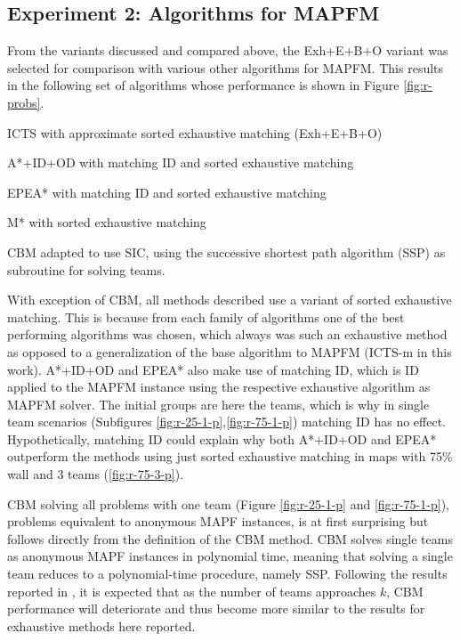 \documentclass[english]{article}
\begin{document}
	\subsection{Experiment 2: Algorithms for MAPFM}
	From the variants discussed and compared above, the Exh+E+B+O variant was selected for comparison with various other algorithms for MAPFM. This results in the following set of algorithms whose performance is shown in Figure \ref{fig:r-probs}.
	\begin{itemize}
		\begin{minipage}{0.45\linewidth}
			\item ICTS with approximate sorted exhaustive matching (Exh+E+B+O)
			\item A*+ID+OD with matching ID and sorted exhaustive matching\cite{bruin2021}
			\item EPEA* with matching ID and sorted exhaustive matching\cite{jong2021}
		\end{minipage}
		\hspace{1cm}
		\begin{minipage}{0.40\linewidth}
			\item M* with sorted exhaustive matching\cite{donszelmann2021}
			\item CBM adapted to use SIC, using the successive shortest path algorithm (SSP) \cite{goldberg1987} as subroutine for solving teams\cite{baauw2021}.
		\end{minipage}
	\end{itemize}
	With exception of CBM, all methods described use a variant of sorted exhaustive matching. This is because from each family of algorithms one of the best performing algorithms was chosen, which always was such an exhaustive method as opposed to a generalization of the base algorithm to MAPFM (ICTS-m in this work). A*+ID+OD and EPEA* also make use of matching ID, which is ID applied to the MAPFM instance using the respective exhaustive algorithm as MAPFM solver. The initial groups are here the teams, which is why in single team scenarios (Subfigures \ref{fig:r-25-1-p},\ref{fig:r-75-1-p}) matching ID has no effect. Hypothetically, matching ID could explain why both A*+ID+OD and EPEA* outperform the methods using just sorted exhaustive matching in maps with 75\% wall and 3 teams (\ref{fig:r-75-3-p}).
	
	CBM solving all problems with one team (Figure \ref{fig:r-25-1-p} and \ref{fig:r-75-1-p}), problems equivalent to anonymous MAPF instances, is at first surprising but follows directly from the definition of the CBM method. CBM solves single teams as anonymous MAPF instances in polynomial time, meaning that solving a single team reduces to a polynomial-time procedure, namely SSP. Following the results reported in \cite{ma2016}, it is expected that as the number of teams approaches $k$, CBM performance will deteriorate and thus become more similar to the results for exhaustive methods here reported.
\end{document}
